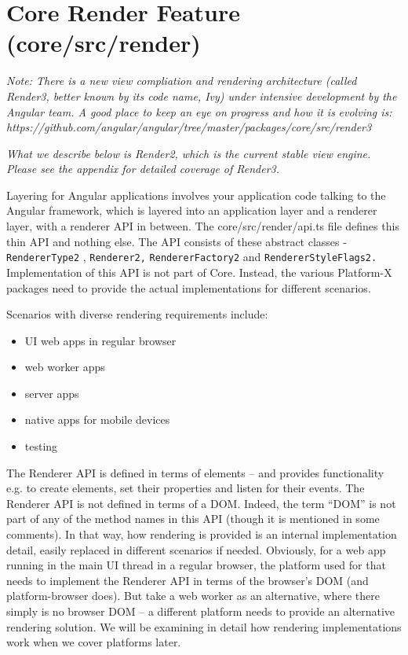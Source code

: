\section{Core Render Feature (core/src/render)}

\emph{Note: There is a new view compliation and rendering architecture  (called}
\emph{Render3, better known by its code name, Ivy) under intensive development}
\emph{by the Angular team. A good place to keep an eye on progress and how it is}
\emph{evolving is:}
\emph{https://github.com/angular/angular/tree/master/packages/core/src/render3}

\emph{What we describe below is Render2, which is the current stable view}
\emph{engine. Please see the appendix for detailed coverage of Render3.}

Layering for Angular applications involves your application code talking to the Angular
framework, which is layered into an application layer and a renderer layer, with a
renderer API in between. The core/src/render/api.ts file defines this thin API and
nothing else. The API consists of these abstract classes -
\texttt{RendererType2}
,
\texttt{Renderer2,}
\texttt{RendererFactory2}
and
\texttt{RendererStyleFlags2.}
Implementation of this API is not
part of Core. Instead, the various Platform-X packages need to provide the actual
implementations for different scenarios.

Scenarios with diverse rendering requirements include:

\begin{itemize}
  \item UI web apps in regular browser
  \item web worker apps
  \item server apps
  \item native apps for mobile devices
  \item testing
\end{itemize}

The Renderer API is defined in terms of elements – and provides functionality e.g. to
create elements, set their properties and listen for their events. The Renderer API is
not defined in terms of a DOM. Indeed, the term “DOM” is not part of any of the
method names in this API (though it is mentioned in some comments). In that way,
how rendering is provided is an internal implementation detail, easily replaced in
different scenarios if needed. Obviously, for a web app running in the main UI thread
in a regular browser, the platform used for that needs to implement the Renderer API
in terms of the browser’s DOM (and platform-browser does). But take a web worker
as an alternative, where there simply is no browser DOM – a different platform needs
to provide an alternative rendering solution. We will be examining in detail how
rendering implementations work when we cover platforms later.

